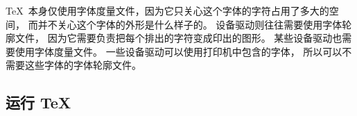\TeX\ 本身仅使用字体度量文件，因为它只关心这个字体的字符占用了多大的空间，
而并不关心这个字体的外形是什么样子的。
设备驱动则往往需要使用字体轮廓文件，
因为它需要负责把每个排出的字符变成印出的图形。
某些设备驱动也需要使用字体度量文件。
一些设备驱动可以使用打印机中包含的字体，
所以可以不需要这些字体的字体轮廓文件。


\subsection{运行 \TeX}

